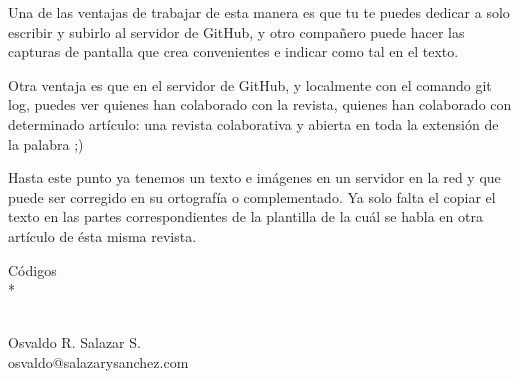 \begin{multicols}{2}
Una de las ventajas de trabajar de esta manera es que tu te puedes dedicar a solo escribir y subirlo al servidor de GitHub, y otro compañero puede hacer las capturas de pantalla que crea convenientes e indicar como tal en el texto.\par

Otra ventaja es que en el servidor de GitHub, y localmente con el comando git log, puedes ver quienes han colaborado con la revista, quienes han colaborado con determinado artículo: una revista colaborativa y abierta en toda la extensión de la palabra ;)\par

Hasta este punto ya tenemos un texto e imágenes en un servidor en la red y que puede ser corregido en su ortografía o complementado. Ya solo falta el copiar el texto en las partes correspondientes de la plantilla de la cuál se habla en otra artículo de ésta misma revista.\par


\Code
   {Códigos}
   {
   \\*
   \\
   \\
   }

\begin{flushright}
Osvaldo R. Salazar S. \\
osvaldo@salazarysanchez.com
\end{flushright}

\end{multicols}
